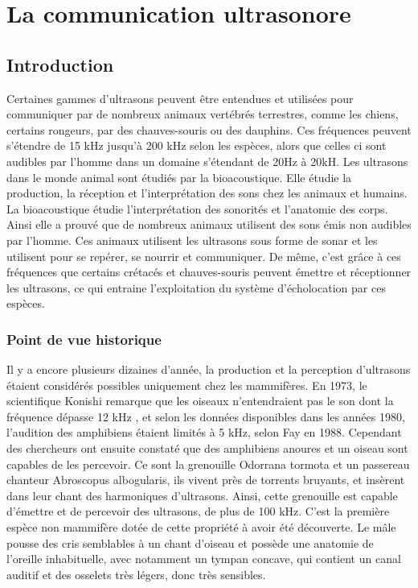 \section{La communication ultrasonore}

\subsection{Introduction}

Certaines gammes d'ultrasons peuvent être entendues et utilisées pour
communiquer par de nombreux animaux vertébrés terrestres, comme les
chiens, certains rongeurs, par des chauves-souris ou des dauphins. Ces
fréquences peuvent s'étendre de 15 kHz jusqu'à 200 kHz selon les
espèces, alors que celles ci sont audibles par l'homme dans un domaine
s'étendant de 20Hz à 20kH. Les ultrasons dans le monde animal sont
étudiés par la bioacoustique. Elle étudie la production, la réception et
l'interprétation des sons chez les animaux et humains. La bioacoustique
étudie l'interprétation des sonorités et l'anatomie des corps. Ainsi
elle a prouvé que de nombreux animaux utilisent des sons émis non
audibles par l'homme. Ces animaux utilisent les ultrasons sous forme de
sonar et les utilisent pour se repérer, se nourrir et communiquer. De
même, c'est grâce à ces fréquences que certains crétacés et
chauves-souris peuvent émettre et réceptionner les ultrasons, ce qui
entraine l'exploitation du système d'écholocation par ces espèces.

\subsubsection{Point de vue historique}

Il y a encore plusieurs dizaines d'année, la production et la perception
d'ultrasons étaient considérés possibles uniquement chez les mammifères.
En 1973, le scientifique Konishi remarque que les oiseaux n'entendraient
pas le son dont la fréquence dépasse 12 kHz , et selon les données
disponibles dans les années 1980, l'audition des amphibiens étaient
limités à 5 kHz, selon Fay en 1988. Cependant des chercheurs ont ensuite
constaté que des amphibiens anoures et un oiseau sont capables de les
percevoir. Ce sont la grenouille Odorrana tormota et un passereau
chanteur Abroscopus albogularis, ils vivent près de torrents bruyants,
et insèrent dans leur chant des harmoniques d'ultrasons. Ainsi, cette
grenouille est capable d'émettre et de percevoir des ultrasons, de plus
de 100 kHz. C'est la première espèce non mammifère dotée de cette
propriété à avoir été découverte. Le mâle pousse des cris semblables à
un chant d'oiseau et possède une anatomie de l'oreille inhabituelle,
avec notamment un tympan concave, qui contient un canal auditif et des
osselets très légers, donc très sensibles.

